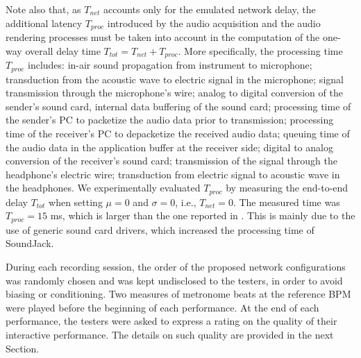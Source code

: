 Note also that, as $T_{net}$ accounts only for the emulated network delay, the additional latency $T_{proc}$ introduced by the audio acquisition and the audio rendering processes must be taken into account in the computation of the one-way overall delay time $T_{tot}=T_{net}+ T_{proc}$.
More specifically, the processing time $T_{proc}$ includes: in-air sound propagation from instrument to microphone; transduction from the acoustic wave to electric signal in the microphone; signal transmission through the microphone's wire; analog to digital conversion of the sender's sound card, internal data buffering of the sound card; processing time of the sender's PC to packetize the audio data prior to transmission; processing time of the receiver's PC to depacketize the received audio data; queuing time of the audio data in the application buffer at the receiver side; digital to analog conversion of the receiver's sound card; transmission of the signal through the headphone's electric wire; transduction from electric signal to acoustic wave in the headphones.
We experimentally evaluated $T_{proc}$ by measuring the end-to-end delay $T_{tot}$ when setting $\mu=0$ and $\sigma=0$, i.e., $T_{net}=0$. The measured time was $T_{proc}=15$ ms, which is larger than the one reported in \cite{carot2007networked}. This is mainly due to the use of generic sound card drivers, which increased the processing time of SoundJack.

During each recording session, the order of the proposed network configurations was randomly chosen and was kept undisclosed to the testers, in order to avoid biasing or conditioning. Two measures of metronome beats at the reference BPM were played before the beginning of each performance. At the end of each performance, the testers were asked to express a rating on the quality of their interactive performance. The details on such quality are provided in the next Section.



